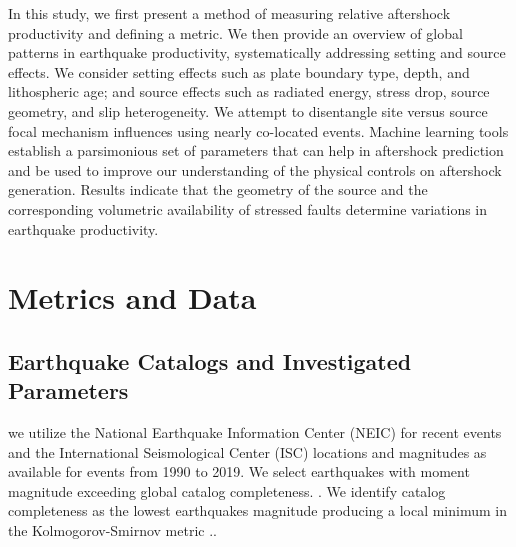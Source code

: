 \documentclass[draft, jgrga]{agujournal2018}
\begin{document}
In this study, we first present a method of measuring relative aftershock productivity and defining a metric. We then provide an overview of global patterns in earthquake productivity, systematically addressing setting and source effects. We consider setting effects such as plate boundary type, depth, and lithospheric age; and source effects such as radiated energy, stress drop, source geometry, and slip heterogeneity.  We attempt to disentangle site versus source focal mechanism influences using nearly co-located events. Machine learning tools establish a parsimonious set of parameters that can help in aftershock prediction and be used to improve our understanding of the physical controls on aftershock generation. Results indicate that the geometry of the source and the corresponding volumetric availability of stressed faults determine variations in earthquake productivity.

\section{Metrics and Data}

\subsection{Earthquake Catalogs and Investigated Parameters}

 we utilize the National Earthquake Information Center (NEIC) for recent events and the International Seismological Center (ISC) locations and magnitudes as available for events from 1990 to 2019. We select earthquakes with moment magnitude exceeding global catalog completeness. . We identify catalog completeness as the lowest earthquakes magnitude producing a local minimum in the Kolmogorov-Smirnov metric \citep[following][]{Clauset2009Power-lawData, Goebel2017WhatExperiments}..
\end{document}
